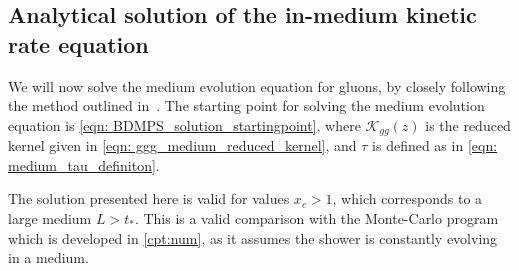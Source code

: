\documentclass[main.tex]{subfiles}
\begin{document}
\subsection{Analytical solution of the in-medium kinetic rate equation}\label{sec: BDMPS_solution}
We will now solve the medium evolution equation for gluons, by closely following the method outlined in~\cite{Energy_flow_medium_cascade_2016}.
The starting point for solving the medium evolution equation is \autoref{eqn: BDMPS_solution_startingpoint}, where \(\mathcal{K}_{gg}(z)\) is the reduced kernel given in \autoref{eqn: ggg_medium_reduced_kernel}, and \(\tau \) is defined as in \autoref{eqn: medium_tau_definiton}.

The solution presented here is valid for values \(x_c > 1\), which corresponds to a large medium \(L>t_*\). This is a valid comparison with the Monte-Carlo program which is developed in \autoref{cpt:num}, as it assumes the shower is constantly evolving in a medium. 
\end{document}
